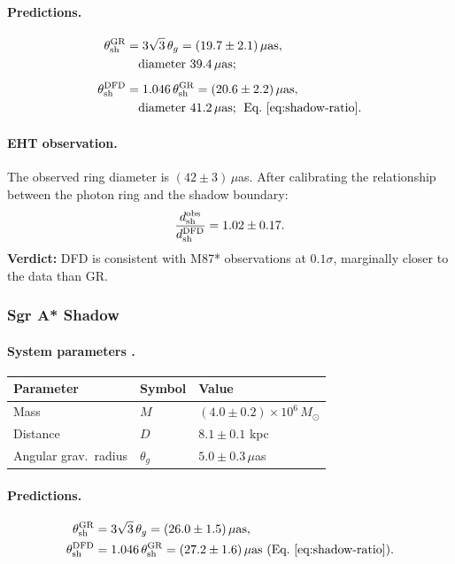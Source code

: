 \paragraph{Predictions.}
\begin{align}
\theta_{\rm sh}^{\rm GR}
  &= 3\sqrt{3}\,\theta_g
   = (19.7 \pm 2.1)\,\mu\text{as},
   \notag\\
  &\quad\text{diameter } 39.4\,\mu\text{as};
   \\[4pt]
\theta_{\rm sh}^{\rm DFD}
  &= 1.046\,\theta_{\rm sh}^{\rm GR}
   = (20.6 \pm 2.2)\,\mu\text{as},
   \notag\\
  &\quad\text{diameter } 41.2\,\mu\text{as;\;
   Eq.~\eqref{eq:shadow-ratio}}.
\end{align}

\paragraph{EHT observation.}
The observed ring diameter is $(42 \pm 3)\,\mu$as. After calibrating the relationship between the photon ring and the shadow boundary:
\begin{equation}
\frac{d_{\rm sh}^{\rm obs}}{d_{\rm sh}^{\rm DFD}} = 1.02 \pm 0.17.
\end{equation}
\textbf{Verdict:} DFD is consistent with M87* observations at $0.1\sigma$, marginally closer to the data than GR.

\subsubsection{Sgr A* Shadow}\label{sec:strong-sgra}

\paragraph{System parameters \cite{EHT_SgrA_2022}.}
\begin{center}
\renewcommand{\arraystretch}{1.1}
\begin{tabular}{lll}
\toprule
Parameter & Symbol & Value \\
\midrule
Mass & $M$ & $(4.0 \pm 0.2) \times 10^6\, M_\odot$ \\
Distance & $D$ & $8.1 \pm 0.1$ kpc \\
Angular grav.\ radius & $\theta_g$ & $5.0 \pm 0.3\,\mu$as \\
\bottomrule
\end{tabular}
\end{center}

\paragraph{Predictions.}
\begin{align}
\theta_{\rm sh}^{\rm GR} &= 3\sqrt{3}\,\theta_g = (26.0 \pm 1.5)\,\mu\text{as}, \\
\theta_{\rm sh}^{\rm DFD} &= 1.046\,\theta_{\rm sh}^{\rm GR} = (27.2 \pm 1.6)\,\mu\text{as (Eq.~\ref{eq:shadow-ratio})}.
\end{align}

